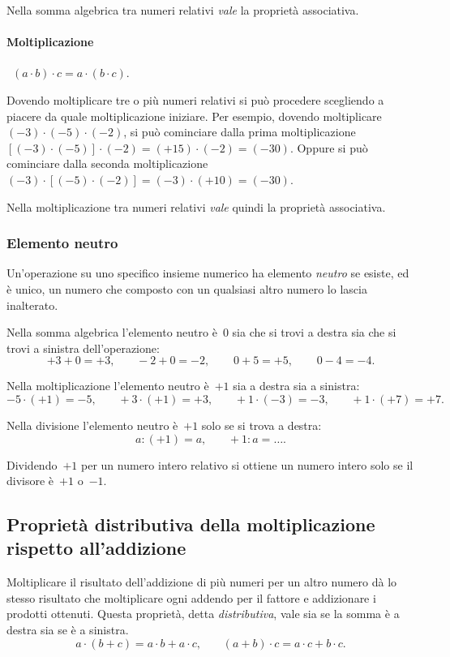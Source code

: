 Nella somma algebrica tra numeri relativi \emph{vale} la proprietà associativa.

\paragraph{Moltiplicazione}~$(a \cdot b)\cdot c = a\cdot (b\cdot c)$.

Dovendo moltiplicare tre o più numeri relativi si può procedere scegliendo a piacere da quale moltiplicazione iniziare. Per esempio,
dovendo moltiplicare~$(-3)\cdot (-5)\cdot (-2)$,
si può cominciare dalla prima moltiplicazione~$[(-3)\cdot (-5)]\cdot (-2)=(+15)\cdot (-2)=(-30)$.
Oppure si può cominciare dalla seconda moltiplicazione~$(-3)\cdot [(-5)\cdot (-2)]=(-3)\cdot (+10)=(-30)$.

Nella moltiplicazione tra numeri relativi \emph{vale} quindi la proprietà associativa.

\subsubsection{Elemento neutro}

Un'operazione su uno specifico insieme numerico ha elemento \emph{neutro} se esiste, ed è unico, un numero che composto
con un qualsiasi altro numero lo lascia inalterato.

Nella somma algebrica l'elemento neutro è~0 sia che si trovi a destra sia che si trovi a sinistra dell'operazione:
\[+3+0=+3\text{,}\qquad -2+0=-2\text{,}\qquad~0+5=+5\text{,}\qquad~0-4=-4. \]	
		
Nella moltiplicazione l'elemento neutro è~$+1$ sia a destra sia a sinistra:
\[-5\cdot (+1) =-5\text{,}\qquad +3\cdot (+1) = +3\text{,}\qquad +1\cdot (-3) = -3\text{,}\qquad +1\cdot (+7) = +7.\]
		
Nella divisione l'elemento neutro è~$+1$ solo se si trova a destra:
\[a:(+1)=a\text{,}\qquad +1:a =\ldots. \]

Dividendo~$+1$ per un numero intero relativo si ottiene un numero intero solo se il divisore è~$+1$ o~$-1$.

\subsection{Proprietà distributiva della moltiplicazione rispetto all'addizione}
Moltiplicare il risultato dell'addizione di più numeri per un altro numero dà lo stesso risultato
che moltiplicare ogni addendo per il fattore e addizionare i prodotti ottenuti. Questa proprietà,
detta \emph{distributiva}, vale sia se la somma è a destra sia se è a sinistra.
\[a\cdot(b+c)=a\cdot b+a\cdot c\text{,}\qquad (a+b)\cdot c=a\cdot c+b\cdot c.\]

